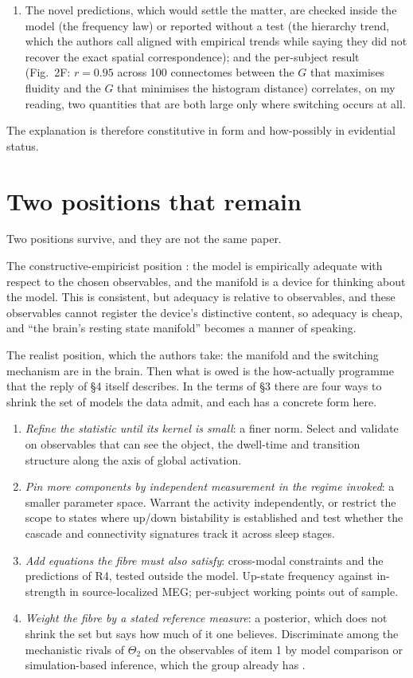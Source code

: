 \documentclass[11pt]{article}
\begin{document}
\begin{enumerate}
\item[To R4] The novel predictions, which would settle the matter, are checked inside the model (the frequency law) or reported without a test (the hierarchy trend, which the authors call aligned with empirical trends while saying they did not recover the exact spatial correspondence); and the per-subject result (Fig.~2F: $r=0.95$ across 100 connectomes between the $G$ that maximises fluidity and the $G$ that minimises the histogram distance) correlates, on my reading, two quantities that are both large only where switching occurs at all.
\end{enumerate}
The explanation is therefore constitutive in form and how-possibly in evidential status.

\section{Two positions that remain}
Two positions survive, and they are not the same paper.

The constructive-empiricist position \parencite{vanfraassen1980}: the model is empirically adequate with respect to the chosen observables, and the manifold is a device for thinking about the model. This is consistent, but adequacy is relative to observables, and these observables cannot register the device's distinctive content, so adequacy is cheap, and ``the brain's resting state manifold'' becomes a manner of speaking.

The realist position, which the authors take: the manifold and the switching mechanism are in the brain. Then what is owed is the how-actually programme that the reply of \S4 itself describes. In the terms of \S3 there are four ways to shrink the set of models the data admit, and each has a concrete form here.
\begin{enumerate}
\item \emph{Refine the statistic until its kernel is small}: a finer norm. Select and validate on observables that can see the object, the dwell-time and transition structure along the axis of global activation.
\item \emph{Pin more components by independent measurement in the regime invoked}: a smaller parameter space. Warrant the activity independently, or restrict the scope to states where up/down bistability is established and test whether the cascade and connectivity signatures track it across sleep stages.
\item \emph{Add equations the fibre must also satisfy}: cross-modal constraints and the predictions of R4, tested outside the model. Up-state frequency against in-strength in source-localized MEG; per-subject working points out of sample.
\item \emph{Weight the fibre by a stated reference measure}: a posterior, which does not shrink the set but says how much of it one believes. Discriminate among the mechanistic rivals of $\Theta_2$ on the observables of item 1 by model comparison or simulation-based inference, which the group already has \parencite{hashemi2024}.
\end{enumerate}
\end{document}

